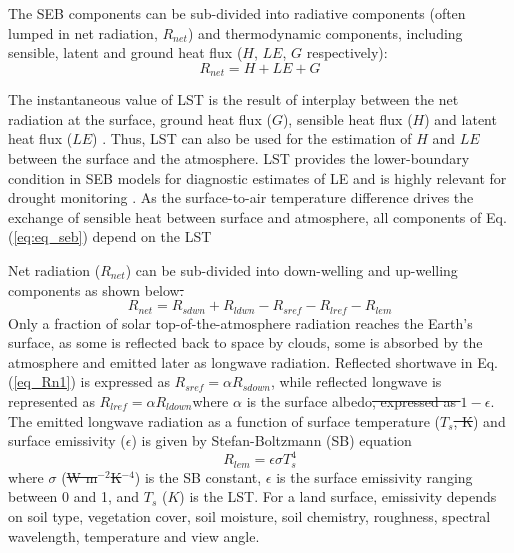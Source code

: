 \documentclass[fleqn,10pt]{wlscirep}
\providecommand{\DIFaddtex}[1]{{\protect\color{blue}\uwave{#1}}} %
\providecommand{\DIFdeltex}[1]{{\protect\color{red}\sout{#1}}}                      %
\providecommand{\DIFaddbegin}{} %
\providecommand{\DIFaddend}{} %
\providecommand{\DIFdelbegin}{} %
\providecommand{\DIFdelend}{} %
\providecommand{\DIFadd}[1]{\texorpdfstring{\DIFaddtex{#1}}{#1}} %
\providecommand{\DIFdel}[1]{\texorpdfstring{\DIFdeltex{#1}}{}} %
\begin{document}
The SEB components can be sub-divided into radiative components (often lumped in net radiation, $R_{net}$) and thermodynamic components, including sensible, latent and ground heat flux ($H$, $LE$, $G$ respectively):
\begin{equation}\label{eq:eq_seb}
R_{net} = H + LE + G 
\end{equation}

The instantaneous value of LST is the result of interplay between the net radiation at the surface, ground heat flux ($G$), sensible heat flux ($H$) and latent heat flux ($LE$) \cite{wang2013global}. Thus, LST can also be used for the estimation of $H$ \cite{sun1995relationship} and $LE$ \cite{jacob2001comprehensive} between the surface and the atmosphere. LST provides the lower-boundary condition in SEB models for diagnostic estimates of LE  and is highly relevant for drought monitoring \cite{trebs2021role,mallick2016canopy,mallick2015reintroducing}. As the surface-to-air temperature difference drives the exchange of sensible heat between surface and atmosphere, all components of Eq. (\ref{eq:eq_seb}) depend on the LST\DIFaddbegin \DIFadd{.
 }\DIFaddend 

 
 Net radiation ($R_{net}$) can be sub-divided into down-welling and up-welling components \cite{verma2016global} as shown below\DIFdelbegin \DIFdel{.
}\DIFdelend \DIFaddbegin \DIFadd{:
}\DIFaddend \begin{equation}\label{eq_Rn1}
R_{net} = R_{sdwn} + R_{ldwn} - R_{sref} - R_{lref} - R_{lem}
\end{equation}
 Only a fraction of solar top-of-the-atmosphere radiation reaches the Earth's surface, as some is reflected back to space by clouds, some is absorbed by the atmosphere and emitted later as longwave radiation. Reflected shortwave in Eq. ({\ref{eq_Rn1}}) is expressed as $R_{sref} = \alpha R_{sdown}$, while reflected longwave is represented as $R_{lref} = \alpha R_{ldown}$\DIFaddbegin \DIFadd{, }\DIFaddend where $\alpha$ is the surface albedo\DIFdelbegin \DIFdel{, expressed as $1 - \epsilon$}\DIFdelend . The emitted longwave radiation as a function of surface temperature ($T_s$\DIFdelbegin \DIFdel{, K}\DIFdelend ) and surface emissivity ($\epsilon$) is given by Stefan-Boltzmann (SB) equation \cite{lhomme1988radiative}
\begin{equation}\label{eq_Rlem}
R_{lem}= \epsilon \sigma T_{s}^{4}
\end{equation}
where $\sigma$ (\DIFdelbegin \DIFdel{W m$^{-2}$K$^{-4}$}\DIFdelend \DIFaddbegin \DIFadd{$Wm^{-2}K^{-4}$}\DIFaddend ) is the SB constant, $\epsilon$ is the surface emissivity ranging between 0 and 1, and $T_{s}$ (\DIFdelbegin \DIFdel{$K$}\DIFdelend \DIFaddbegin \DIFadd{K}\DIFaddend ) is the LST. For a land surface, emissivity depends on soil type, vegetation cover, soil moisture, soil chemistry, roughness, spectral wavelength, temperature and view angle\cite{norman1995terminology}. 
\end{document}
